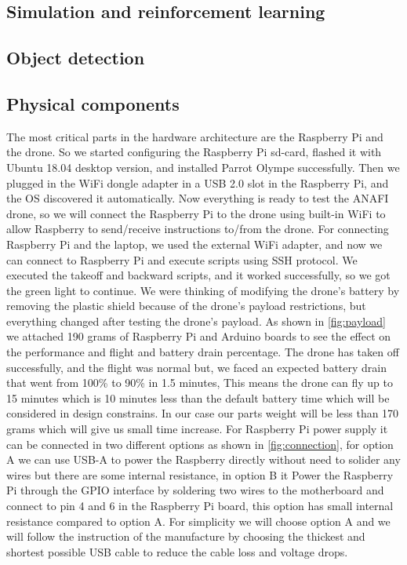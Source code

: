 \documentclass[../main.tex]{subfiles}
\begin{document}
\subsection{Simulation and reinforcement learning}

\lipsum[1]

\subsection{Object detection}

\lipsum[1]

\subsection{Physical components}
The most critical parts in the hardware architecture are the Raspberry Pi and the drone. So we started configuring the Raspberry Pi sd-card, flashed it with Ubuntu 18.04 desktop version, and installed Parrot Olympe successfully. Then we plugged in the WiFi dongle adapter in a USB 2.0 slot in the Raspberry Pi, and the OS discovered it automatically. Now everything is ready to test the  \textsc{ANAFI} drone, so we will connect the Raspberry Pi to the drone using built-in WiFi to allow Raspberry to send/receive instructions to/from the drone. For connecting Raspberry Pi and the laptop, we used the external WiFi adapter, and now we can connect to Raspberry Pi and execute scripts using SSH protocol. We executed the takeoff and backward scripts, and it worked successfully, so we got the green light to continue. We were thinking of modifying the drone's battery by removing the plastic shield because of the drone's payload restrictions, but everything changed after testing the drone's payload. As shown in \cref{fig:payload} we attached 190 grams of Raspberry Pi and Arduino boards to see the effect on the performance and flight and battery drain percentage. The drone has taken off successfully, and the flight was normal but, we faced an expected battery drain that went from 100\% to 90\% in 1.5 minutes, This means the drone can fly up to 15 minutes which is 10 minutes less than the default battery time which will be considered in design constrains. In our case our parts weight will be less than 170 grams which will give us small time increase. For Raspberry Pi power supply it can be connected in two different options as shown in \cref{fig:connection}, for option A we can use USB-A to power the Raspberry directly without need to solider any wires but there are some internal resistance, in option B it Power the Raspberry Pi through the GPIO interface by soldering two wires to the motherboard and connect to pin 4 and 6 in the Raspberry Pi board, this option has small internal resistance compared to option A. For simplicity we will choose option A and we will follow the instruction of the manufacture by choosing the thickest and shortest possible USB cable to reduce the cable loss and voltage drops. 	 
\end{document}
